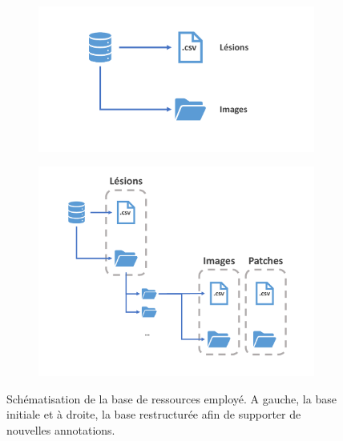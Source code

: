 \begin{figure}[H]
\centering
    \begin{subfigure}{.45\textwidth}
      \centering
      \includegraphics[width=\linewidth]{contents/chapter_2/resources/db_structure_old.pdf}
    \end{subfigure}
    \begin{subfigure}{.45\textwidth}
      \centering
      \includegraphics[width=\linewidth]{contents/chapter_2/resources/db_structure_new.pdf}
    \end{subfigure}
    \caption{Schématisation de la base de ressources employé. A gauche, la base initiale et à droite, la base restructurée afin de supporter de nouvelles annotations.}
    \label{fig:db_structure}
\end{figure}\par
